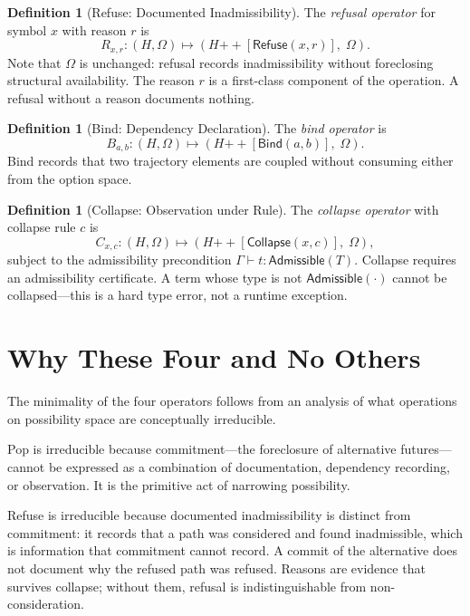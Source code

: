 \documentclass[12pt, a4paper, openany]{book}
\theoremstyle{plain}
\theoremstyle{definition}
\newtheorem{definition}[theorem]{Definition}
\theoremstyle{remark}
\newcommand{\Refuse}{\mathsf{Refuse}}
\newcommand{\Bind}{\mathsf{Bind}}
\newcommand{\Collapse}{\mathsf{Collapse}}
\newcommand{\Adm}{\mathsf{Admissible}}
\begin{document}
\begin{definition}[Refuse: Documented Inadmissibility]
The \emph{refusal operator} for symbol $x$ with reason $r$ is
\[
R_{x,r} : (H, \Omega) \mapsto (H \mathbin{++} [\Refuse(x, r)],\; \Omega).
\]
Note that $\Omega$ is unchanged: refusal records inadmissibility without
foreclosing structural availability. The reason $r$ is a first-class component
of the operation. A refusal without a reason documents nothing.
\end{definition}

\begin{definition}[Bind: Dependency Declaration]
The \emph{bind operator} is
\[
B_{a,b} : (H, \Omega) \mapsto (H \mathbin{++} [\Bind(a, b)],\; \Omega).
\]
Bind records that two trajectory elements are coupled without consuming either
from the option space.
\end{definition}

\begin{definition}[Collapse: Observation under Rule]
The \emph{collapse operator} with collapse rule $c$ is
\[
C_{x,c} : (H, \Omega) \mapsto (H \mathbin{++} [\Collapse(x, c)],\; \Omega),
\]
subject to the admissibility precondition $\Gamma \vdash t : \Adm(T)$.
Collapse requires an admissibility certificate. A term whose type is not
$\Adm(\cdot)$ cannot be collapsed---this is a hard type error, not a runtime
exception.
\end{definition}

\section{Why These Four and No Others}

The minimality of the four operators follows from an analysis of what operations
on possibility space are conceptually irreducible.

Pop is irreducible because commitment---the foreclosure of alternative
futures---cannot be expressed as a combination of documentation, dependency
recording, or observation. It is the primitive act of narrowing possibility.

Refuse is irreducible because documented inadmissibility is distinct from
commitment: it records that a path was considered and found inadmissible, which
is information that commitment cannot record. A commit of the alternative does not
document why the refused path was refused. Reasons are evidence that survives
collapse; without them, refusal is indistinguishable from non-consideration.
\end{document}
